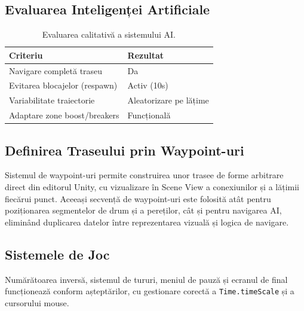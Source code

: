 \subsection{Evaluarea Inteligenței Artificiale}

\begin{table}[h]
\centering
\small
\begin{tabular}{ll}
\toprule
\textbf{Criteriu} & \textbf{Rezultat} \\
\midrule
Navigare completă traseu & Da \\
Evitarea blocajelor (respawn) & Activ (10s) \\
Variabilitate traiectorie & Aleatorizare pe lățime \\
Adaptare zone boost/breakers & Funcțională \\
\bottomrule
\end{tabular}
\caption{Evaluarea calitativă a sistemului AI.}
\label{tab:ai_eval}
\end{table}

\subsection{Definirea Traseului prin Waypoint-uri}

Sistemul de waypoint-uri permite construirea unor trasee de forme arbitrare direct din editorul Unity, cu vizualizare în Scene View a conexiunilor și a lățimii fiecărui punct. Aceeași secvență de waypoint-uri este folosită atât pentru poziționarea segmentelor de drum și a pereților, cât și pentru navigarea AI, eliminând duplicarea datelor între reprezentarea vizuală și logica de navigare.

\subsection{Sistemele de Joc}

Numărătoarea inversă, sistemul de tururi, meniul de pauză și ecranul de final funcționează conform așteptărilor, cu gestionare corectă a \texttt{Time.timeScale} și a cursorului mouse.
